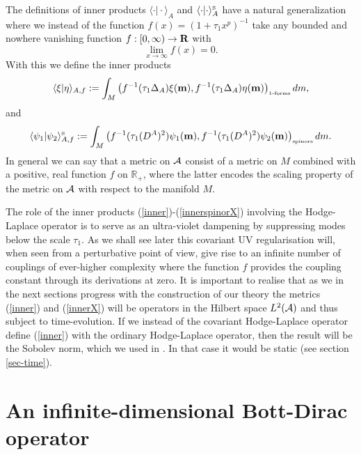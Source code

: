 \documentclass[12pt]{article}
\def\ca{{\cal A}}
\newcommand{\R}{\operatorname{\bold R}}
\begin{document}
The definitions of inner products $\langle \cdot \vert \cdot \rangle_{A}$ and $\langle \cdot \vert \cdot \rangle_{A}^{\mbox{\tiny S}}$ have a natural generalization where we instead of the function $f(x)=( 1+ \tau_1 x^p)^{-1}$ take any bounded and nowhere vanishing   function $f:[0, \infty) \to \R$ with 
$$
\lim_{x\to \infty} f(x)=0.
$$ 
With this we define the inner products
\begin{equation}
\langle \xi \vert \eta \rangle_{A,f} := \int_M \left(  f^{-1}(\tau_1 \Delta_A) \xi({\bf m})         , f^{-1}(\tau_1 \Delta_A) \eta({\bf m})   \right)_{\mbox{\tiny 1-forms}}       dm,
\label{innerX}
\end{equation}
and 
\begin{equation}
\langle \psi_1 \vert \psi_2 \rangle_{A,f}^{\mbox{\tiny S}} := \int_M \left(  f^{-1}(\tau_1 (D^A)^2) \psi_1({\bf m})         ,  f^{-1}(\tau_1 (D^A)^2) \psi_2({\bf m})   \right)_{\mbox{\tiny spinors}}        dm.
\label{innerspinorX}
\end{equation}
In general we can say that a metric on $\ca$ consist of a metric on $M$ combined with a positive, real function $f$ on $\mathbb{R}_+$, where the latter encodes the scaling property of the metric on $\ca$ with respect to the manifold $M$. 



 

The role of the inner products (\ref{inner})-(\ref{innerspinorX}) involving the Hodge-Laplace operator is to serve as an ultra-violet dampening by suppressing modes below the scale $\tau_1$. As we shall see later this covariant UV regularisation will, when seen from a perturbative point of view, give rise to an infinite number of couplings of ever-higher complexity where the function $f$ provides the coupling constant through its derivations at zero.
It is important to realise that as we in the next sections progress with the construction of our theory the metrics (\ref{inner}) and (\ref{innerX}) will be operators in the Hilbert space $L^{2}(\ca)$ and thus subject to time-evolution. 
If we instead of the covariant Hodge-Laplace operator define  (\ref{inner}) with the ordinary Hodge-Laplace operator, then the result will be the Sobolev norm, which we used in \cite{Aastrup:2017vrm}.
In that case it would be static (see section \ref{sec-time}).







\section{An infinite-dimensional Bott-Dirac operator}
\end{document}
